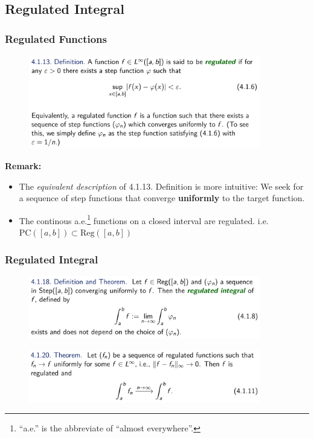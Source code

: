 \documentclass[10pt, t]{beamer}
\begin{document}
\subsection{Regulated Integral}
\begin{frame}
    \frametitle{Regulated Functions}

    \begin{figure}[H]
        \centering
        \includegraphics[width=0.9\textwidth]{2020-12-02-11-57-35.png}
    \end{figure}

    \textbf{Remark:}
    \begin{itemize}
        \item The \textit{equivalent description} of 4.1.13. Definition is more intuitive: We seek for a sequence of step functions that converge \textbf{uniformly} to the target function.
        \item The continous a.e.\footnote[frame]{``a.e.'' is the abbreviate of ``almost everywhere''.} functions on a closed interval are regulated. i.e. $\mathrm{PC}([a,b])\subset\mathrm{Reg}([a,b])$
    \end{itemize}

\end{frame}

\begin{frame}
    \frametitle{Regulated Integral}
    \begin{figure}[H]
        \centering
        \includegraphics[width=0.9\textwidth]{2020-12-02-12-08-32.png}
    \end{figure}
    \begin{figure}[H]
        \centering
        \includegraphics[width=0.9\textwidth]{2020-12-02-12-09-22.png}
    \end{figure}
\end{frame}
\end{document}
